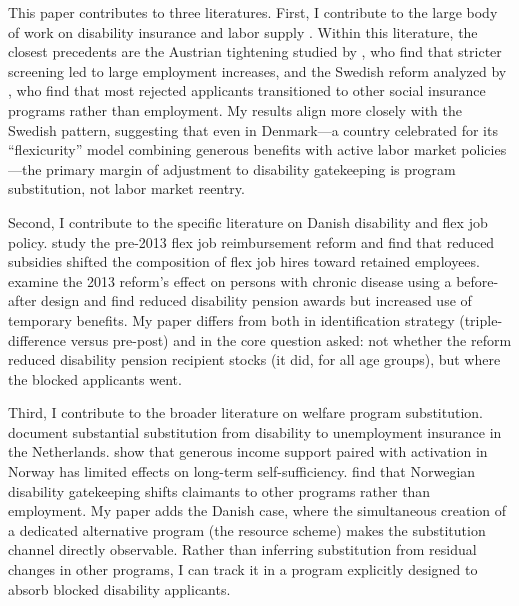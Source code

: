 \documentclass[12pt]{article}
\begin{document}
This paper contributes to three literatures. First, I contribute to the large body of work on disability insurance and labor supply \citep{bound1989health, gruber2000disability, autor2003rise, autor2006growth, vonwachter2011trends, maestas2013does, french2014effect, low2015disability, liebman2015understanding, gelber2017disability, autor2019disability}. Within this literature, the closest precedents are the Austrian tightening studied by \citet{haller2024disability}, who find that stricter screening led to large employment increases, and the Swedish reform analyzed by \citet{karlstrom2008disability}, who find that most rejected applicants transitioned to other social insurance programs rather than employment. My results align more closely with the Swedish pattern, suggesting that even in Denmark---a country celebrated for its ``flexicurity'' model combining generous benefits with active labor market policies---the primary margin of adjustment to disability gatekeeping is program substitution, not labor market reentry.

Second, I contribute to the specific literature on Danish disability and flex job policy. \citet{dagupta2015effect} study the pre-2013 flex job reimbursement reform and find that reduced subsidies shifted the composition of flex job hires toward retained employees. \citet{christensen2021disability} examine the 2013 reform's effect on persons with chronic disease using a before-after design and find reduced disability pension awards but increased use of temporary benefits. My paper differs from both in identification strategy (triple-difference versus pre-post) and in the core question asked: not whether the reform reduced disability pension recipient stocks (it did, for all age groups), but where the blocked applicants went.

Third, I contribute to the broader literature on welfare program substitution. \citet{borghans2014social} document substantial substitution from disability to unemployment insurance in the Netherlands. \citet{markussen2016leaving} show that generous income support paired with activation in Norway has limited effects on long-term self-sufficiency. \citet{dahl2014does} find that Norwegian disability gatekeeping shifts claimants to other programs rather than employment. My paper adds the Danish case, where the simultaneous creation of a dedicated alternative program (the resource scheme) makes the substitution channel directly observable. Rather than inferring substitution from residual changes in other programs, I can track it in a program explicitly designed to absorb blocked disability applicants.
\end{document}
